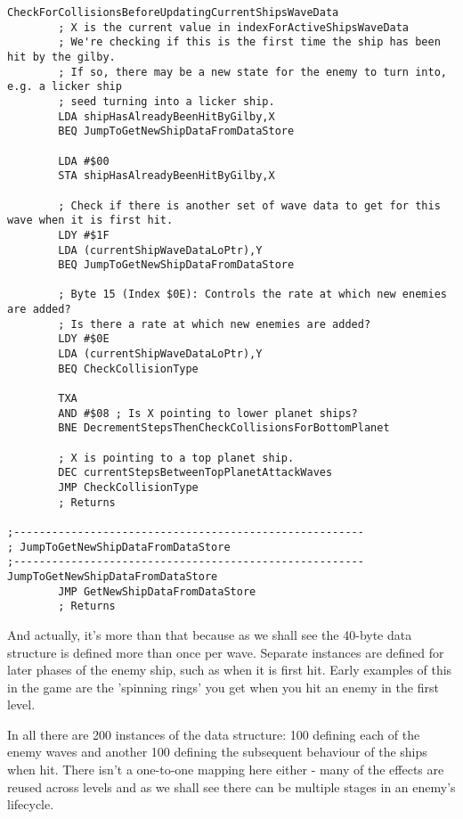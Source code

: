 \begin{lstlisting}
CheckForCollisionsBeforeUpdatingCurrentShipsWaveData
        ; X is the current value in indexForActiveShipsWaveData
        ; We're checking if this is the first time the ship has been hit by the gilby.
        ; If so, there may be a new state for the enemy to turn into, e.g. a licker ship
        ; seed turning into a licker ship.
        LDA shipHasAlreadyBeenHitByGilby,X
        BEQ JumpToGetNewShipDataFromDataStore

        LDA #$00
        STA shipHasAlreadyBeenHitByGilby,X

        ; Check if there is another set of wave data to get for this wave when it is first hit.
        LDY #$1F
        LDA (currentShipWaveDataLoPtr),Y
        BEQ JumpToGetNewShipDataFromDataStore

        ; Byte 15 (Index $0E): Controls the rate at which new enemies are added?
        ; Is there a rate at which new enemies are added?
        LDY #$0E
        LDA (currentShipWaveDataLoPtr),Y
        BEQ CheckCollisionType

        TXA
        AND #$08 ; Is X pointing to lower planet ships?
        BNE DecrementStepsThenCheckCollisionsForBottomPlanet

        ; X is pointing to a top planet ship.
        DEC currentStepsBetweenTopPlanetAttackWaves
        JMP CheckCollisionType
        ; Returns

;-------------------------------------------------------
; JumpToGetNewShipDataFromDataStore
;-------------------------------------------------------
JumpToGetNewShipDataFromDataStore
        JMP GetNewShipDataFromDataStore
        ; Returns
\end{lstlisting}

And actually, it's more than that because as we shall see the  40-byte data
structure is defined more than once per wave. Separate instances are defined for later
phases of the enemy ship, such as when it is first hit. Early examples of this in the game
are the 'spinning rings' you get when you hit an enemy in the first level.

In all there are 200 instances of the  data structure: 100 defining each of the
enemy waves and another 100 defining the subsequent behaviour of the ships when hit. There isn't
a one-to-one mapping here either - many of the effects are reused across levels and as we shall
see there can be multiple stages in an enemy's lifecycle.

